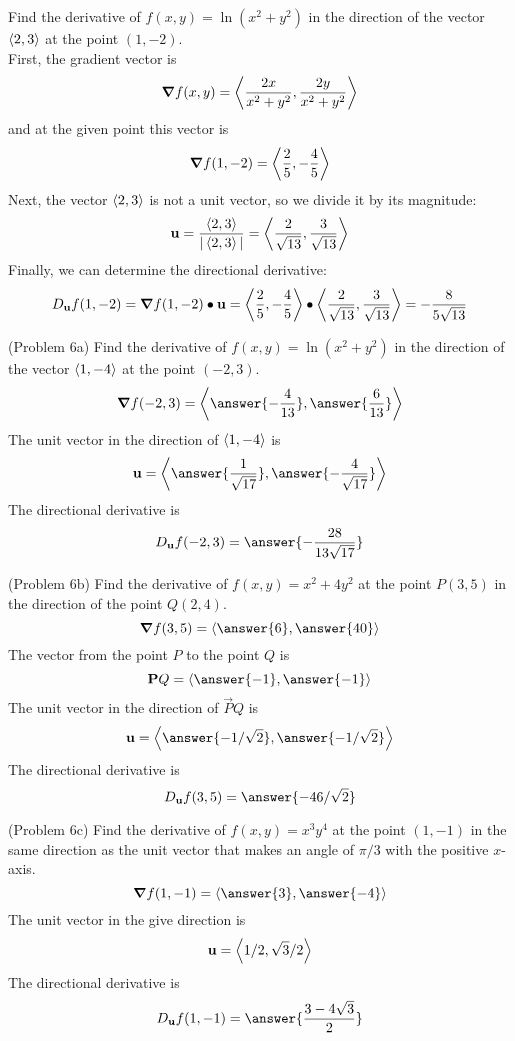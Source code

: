 \documentclass[handout]{ximera}
\begin{document}
\begin{example}[Example 6]
Find the derivative of $f(x,y) = \ln(x^2 + y^2)$ in the direction of the vector $\left\langle 2, 3\right\rangle$ at the point $(1, -2)$.\\
First, the gradient vector is
\[
\boldsymbol\nabla f(x,y) = \left\langle \frac{2x}{x^2 +y^2}, \frac{2y}{x^2 +y^2}\right\rangle
\]
and at the given point this vector is
\[
\boldsymbol\nabla f(1,-2) = \left\langle \frac{2}{5}, -\frac{4}{5}\right\rangle
\]
Next, the vector $\left\langle 2, 3\right\rangle$ is not a unit vector, so we divide it by its magnitude:
\[
\mathbf u = \frac{\left\langle 2, 3\right\rangle}{|\left\langle 2, 3\right\rangle|} = \left\langle \frac{2}{\sqrt{13}}, \frac{3}{\sqrt{13}}\right\rangle
\]
Finally, we can determine the directional derivative:
\[
D_{\mathbf u} f(1, -2) = \boldsymbol\nabla f(1,-2) \bullet \mathbf u = \left\langle \frac{2}{5}, -\frac{4}{5}\right\rangle \bullet \left\langle \frac{2}{\sqrt{13}}, \frac{3}{\sqrt{13}}\right\rangle = -\frac{8}{5\sqrt{13}}
\]
\end{example}

\begin{problem}(Problem 6a)
Find the derivative of $f(x,y) = \ln(x^2 + y^2)$ in the direction of the vector $\left\langle 1, -4\right\rangle$ at the point $(-2, 3)$.\\
\[
\grad f(-2, 3) = \vector{\answer{-\frac{4}{13}}, \answer{\frac{6}{13}}}
\]
The unit vector in the direction of $\left\langle 1, -4\right\rangle$ is
\[
\vec u =  \vector{\answer{\frac{1}{\sqrt{17}}}, \answer{-\frac{4}{\sqrt{17}}}}
\]
The directional derivative is
\[
D_{\vec u} f(-2, 3) = \answer{-\frac{28}{13\sqrt{17}}}
\]
\end{problem}

\begin{problem}(Problem 6b)
Find the derivative of $f(x,y) = x^2 + 4y^2$ at the point $P(3, 5)$ in the direction of the point $Q(2,4)$.\\
\[
\grad f(3, 5) = \vector{\answer{6}, \answer{40}}
\]
The vector from the point $P$ to the point $Q$ is
\[
\vec PQ = \vector{\answer{-1}, \answer{-1}}
\]
The unit vector in the direction of $\vec PQ$ is
\[
\vec u = \vector{\answer{-1/\sqrt 2}, \answer{-1/\sqrt 2}}
\]
The directional derivative is
\[
D_{\vec u} f(3, 5) = \answer{-46/\sqrt 2}
\]

\end{problem}

\begin{problem}(Problem 6c)
Find the derivative of $f(x,y) = x^3 y^4$ at the point $(1,-1)$ in the same direction as the 
unit vector that makes an angle of $\pi/3$ with the positive $x$-axis.\\
\[
\grad f(1, -1) = \vector{\answer{3}, \answer{-4}}
\]
The unit vector in the give direction is
\[
\mathbf u = \left\langle 1/2, \sqrt{3} /2\right\rangle
\]
The directional derivative is
\[
D_{\vec u} f(1, -1) = \answer{\frac{3-4\sqrt 3}{2}}
\]
\end{problem}
\end{document}
